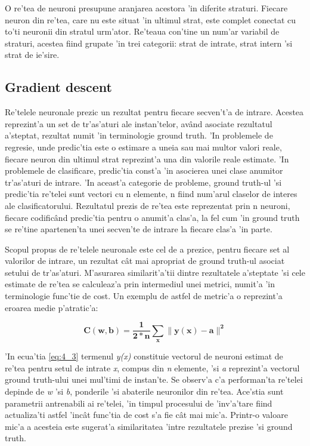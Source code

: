 \documentclass[12pt,a4paper,twoside]{report}
\begin{document}
O re'tea de neuroni presupune aranjarea acestora 'in diferite straturi. Fiecare neuron din re'tea, care nu este situat 'in ultimul strat, este complet conectat cu to'ti neuronii din stratul urm'ator. Re'teaua con'tine un num'ar variabil de straturi, acestea fiind grupate 'in trei categorii: strat de intrate, strat intern 'si strat de ie'sire.

\subsection{Gradient descent}
Re'telele neuronale prezic un rezultat pentru fiecare secven't'a de intrare. Acestea reprezint'a un set de tr'as'aturi ale instan'telor, av\^and asociate rezultatul a'steptat, rezultat numit 'in terminologie ground truth. 'In problemele de regresie, unde predic'tia este o estimare a uneia sau mai multor valori reale, fiecare neuron din ultimul strat reprezint'a una din valorile reale estimate. 'In problemele de clasificare, predic'tia const'a 'in asocierea unei clase anumitor tr'as'aturi de intrare. 'In aceast'a categorie de probleme, ground truth-ul 'si predic'tia re'telei sunt vectori cu n elemente, n fiind num'arul claselor de interes ale clasificatorului. Rezultatul prezis de re'tea este reprezentat prin n neuroni, fiecare codific\^and predic'tia pentru o anumit'a clas'a, la fel cum 'in ground truth se re'tine apartenen'ta  unei secven'te de intrare la fiecare clas'a 'in parte. 

Scopul propus de re'telele neuronale este cel de a prezice, pentru fiecare set al valorilor de intrare, un rezultat c\^at mai apropriat de ground truth-ul asociat setului de tr'as'aturi. M'asurarea similarit'a'tii dintre rezultatele a'steptate 'si cele estimate de re'tea se calculeaz'a prin intermediul unei metrici, numit'a 'in terminologie func'tie de cost. Un exemplu de astfel de metric'a o reprezint'a eroarea medie p'atratic'a:

\begin{equation}
\mathbf{C}(\mathbf{w},\mathbf{b}) = \frac{\mathbf{1}}{\mathbf{2*n}} \sum\limits_{\mathbf{x}}\lVert \mathbf{y(x)} - \mathbf{a} \rVert^\mathbf{2}
\label{eq:4_3}
\end{equation}

'In ecua'tia \ref{eq:4_3} termenul \textit{y(x)} constituie vectorul de neuroni estimat de re'tea pentru setul de intrate \textit{x}, compus din \textit{n} elemente, 'si \textit{a} reprezint'a vectorul ground truth-ului unei mul'timi de instan'te. Se observ'a c'a performan'ta re'telei depinde de \textit{w} 'si \textit{b}, ponderile 'si abaterile neuronilor din re'tea. Ace'stia sunt parametrii antrenabili ai re'telei, 'in timpul procesului de 'inv'a'tare fiind actualiza'ti astfel 'inc\^at func'tia de cost s'a fie c\^at mai mic'a. Printr-o valoare mic'a a acesteia este sugerat'a similaritatea 'intre rezultatele prezise 'si ground truth.
\end{document}
